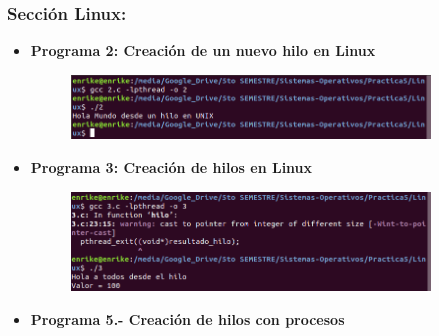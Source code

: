 \documentclass[12pt]{article}
\begin{document}
    		\subsubsection{Sección Linux:}
            
    \begin{itemize}
             \item[\Checkmark] \textbf{Programa 2: Creación de un nuevo hilo en Linux}
             \begin{figure}[h!]
			          \centering
			         \includegraphics[width=0.9\textwidth]{Practica5/Images/linux/2.png}
			         \end{figure}
              \item[\Checkmark] \textbf{Programa 3: Creación de hilos en Linux}
              \begin{figure}[h!]
			          \centering
			         \includegraphics[width=0.9\textwidth]{Practica5/Images/linux/3.png}
			         \end{figure}
             
    
			 \item[\Checkmark] \textbf{Programa 5.- Creación de hilos con procesos}
			 

\end{itemize}
\end{document}
